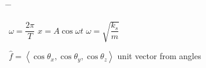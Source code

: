 \begin{tabbing}
	\hspace*{2.16in} \= \hspace*{2.16in} \= \kill    %
	
	$\omega = \dfrac{2 \pi}{T}$\>
	$x = A\cos{\omega t}$ \>
	$\omega = \sqrt{\dfrac{k_s}{m}}$\\
	
\end{tabbing}


$\hat{f} = \left\langle \cos\theta_x, \cos\theta_y, \cos\theta_z \right\rangle$  unit vector from angles  \\

%
%
%
%

\vspace*{0.1 in}


